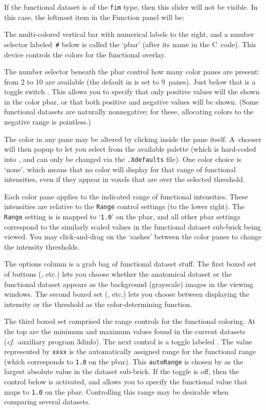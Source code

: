 If the functional dataset is of the {\tt fim} type,
then this slider will not be visible.  In this case,
the leftmost item in the Function panel will be:

The multi-colored vertical bar with numerical
labels to the right, and a number selector labeled~{\tt \#} below
is called the `pbar' (after its name in the C~code).
This device controls the colors for the functional overlay.

The number selector
beneath the pbar control how many color panes
are present: from 2 to 10 are available (the default in \afnit is set
to 9~panes).  Just below that is a toggle switch .
This allows you to specify that only positive values will the
shown in the color pbar, or that both positive and negative
values will be shown.  (Some functional datasets are naturally
nonnegative; for these, allocating colors to the negative range
is pointless.)

The color in any pane may be altered by clicking inside the
pane itself.  A~chooser will then popup to let you select from
the available palette (which is hard-coded into \afni, and can
only be changed via the {\tt .Xdefaults} file).
One color choice is `none', which
means that no color will display for that range of functional
intensities, even if they appear in voxels that are over the
selected threshold.

Each color pane applies to the indicated range of functional
intensities.  These intensities are relative to the {\tt Range}
control settings (to the lower right).
The {\tt Range} setting is is mapped to `{\tt 1.0}' on the pbar,
and all other pbar settings correspond to the similarly scaled
values in the functional dataset sub-brick being viewed.
You may click-and-drag on the `sashes' between the color panes
to change the intensity thresholds.

The options column is a grab bag of functional dataset stuff.
The first boxed set of buttons (, etc\@.)
lets you choose whether the anatomical dataset
or the functional dataset appears as the background (grayscale)
images in the viewing windows.
The second boxed set (, etc\@.)
lets you choose between displaying the intensity or the threshold as the
color-determining function.

The third boxed set comprised the range controls for the functional coloring.
At the top are the minimum and maximum values found in the current
datasets ({\it cf.}~auxiliary program {\sf 3dinfo}).
The next control is a toggle labeled .  The value
represented by {\tt xxxx} is the automatically assigned range for
the functional range (which corresponds to {\tt 1.0} on the pbar).
This {\tt autoRange} is chosen by \afnit as the largest absolute
value in the dataset sub-brick.  If the toggle is off, then
the control below is activated, and allows you to specify the
functional value that maps to {\tt 1.0} on the pbar.  Controlling this
range may be desirable when comparing several datasets.

